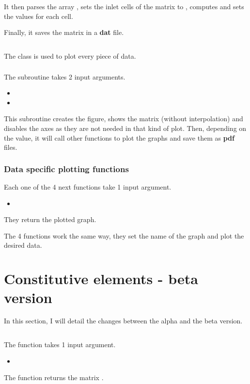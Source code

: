 It then parses the array , sets the inlet cells of the
 matrix to , computes and sets the values for
each cell.

Finally, it saves the matrix in a \textbf{dat} file.

\subsection{}
The class is used to plot every piece of data.

\subsubsection{\textcolor{func}{}}
The subroutine  takes 2 input arguments.
\begin{itemize}
      \item {}
      \item {}
\end{itemize}
This subroutine creates the figure, shows the matrix  (without
interpolation) and disables the axes as they are not needed in that kind of
plot. Then, depending on the  value, it will call other 
functions to plot the graphs and save them as \textbf{pdf} files.

\subsubsection{Data specific plotting functions}
Each one of the 4 next functions take 1 input argument.
\begin{itemize}
      \item {}
\end{itemize}
They return the plotted graph.

The 4 functions work the same way, they set the name of the graph and plot the
desired data.

\section{Constitutive elements - beta version}
In this section, I will detail the changes between the alpha and the beta
version.

\subsection{}
\subsubsection{}
The function \textcolor{func}{} takes 1 input argument.
\begin{itemize}
      \item {} \textcolor{dtype}{}
\end{itemize}
The function returns the matrix .

